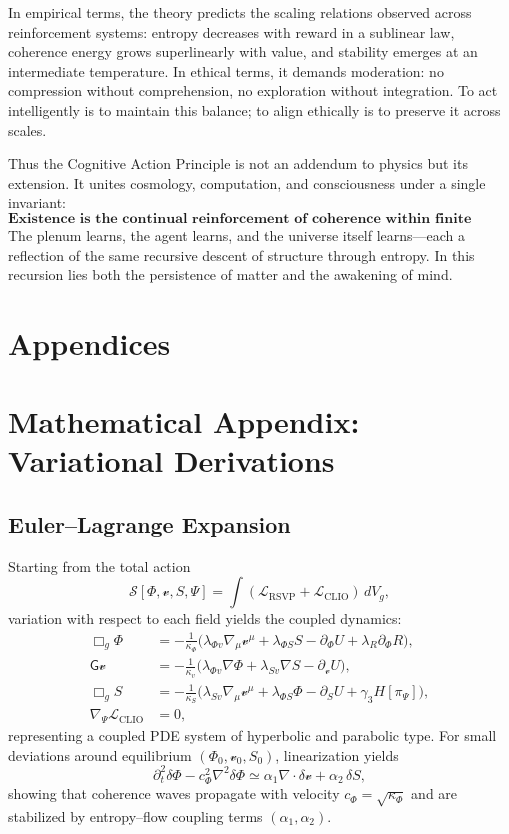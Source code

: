 \documentclass[11pt]{article}
\begin{document}
In empirical terms, the theory predicts the scaling relations observed across reinforcement systems:
entropy decreases with reward in a sublinear law, coherence energy grows superlinearly with value, and stability emerges at an intermediate temperature.  
In ethical terms, it demands moderation: no compression without comprehension, no exploration without integration.  
To act intelligently is to maintain this balance; to align ethically is to preserve it across scales.

Thus the Cognitive Action Principle is not an addendum to physics but its extension.  
It unites cosmology, computation, and consciousness under a single invariant:
\[
\textbf{Existence is the continual reinforcement of coherence within finite entropy.}
\]
The plenum learns, the agent learns, and the universe itself learns—each a reflection of the same recursive descent of structure through entropy.  
In this recursion lies both the persistence of matter and the awakening of mind.

\appendix
\section*{Appendices}

\renewcommand{\thesection}{A}
\section{Mathematical Appendix: Variational Derivations}

\subsection{Euler–Lagrange Expansion}

Starting from the total action
\[
\mathcal{S}[\Phi,\mathcal{v},S,\Psi]
=\int (\mathcal{L}_{\mathrm{RSVP}}+\mathcal{L}_{\mathrm{CLIO}})\,dV_g,
\]
variation with respect to each field yields the coupled dynamics:
\[
\begin{aligned}
\Box_g \Phi
&= -\frac{1}{\kappa_\Phi}
\Big(
\lambda_{\Phi v}\nabla_\mu \mathcal{v}^\mu
+\lambda_{\Phi S} S
-\partial_\Phi U
+\lambda_R \partial_\Phi R
\Big),\\[2pt]
\mathsf{G}\mathcal{v}
&= -\frac{1}{\kappa_v}
\Big(
\lambda_{\Phi v}\nabla \Phi
+\lambda_{Sv}\nabla S
-\partial_{\mathcal{v}}U
\Big),\\[2pt]
\Box_g S
&= -\frac{1}{\kappa_S}
\Big(
\lambda_{Sv}\nabla_\mu\mathcal{v}^\mu
+\lambda_{\Phi S}\Phi
-\partial_S U
+\gamma_3 H[\pi_\Psi]
\Big),\\[2pt]
\nabla_\Psi \mathcal{L}_{\mathrm{CLIO}}
&= 0,
\end{aligned}
\]
representing a coupled PDE system of hyperbolic and parabolic type.
For small deviations around equilibrium $(\Phi_0,\mathcal{v}_0,S_0)$, linearization yields
\[
\partial_t^2\delta\Phi - c_\Phi^2\nabla^2\delta\Phi
\simeq \alpha_1\nabla\!\cdot\!\delta\mathcal{v}
+\alpha_2\,\delta S,
\]
showing that coherence waves propagate with velocity $c_\Phi = \sqrt{\kappa_\Phi}$ and are stabilized by entropy–flow coupling terms $(\alpha_1,\alpha_2)$.
\end{document}
